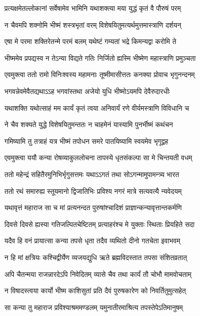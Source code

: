 \twolineshloka
{प्रत्यक्षमेतल्लोकानां सर्वेषामेव भामिनि}
{यथाशक्त्या मया युद्धं कृतं वै पौरुषं परम्}


\twolineshloka
{न चैवमपि शक्नोमि भीष्मं शस्त्रभृतां वरम्}
{विशेषयितुमत्यर्थमुत्तमास्त्राणि दर्शयन्}


\twolineshloka
{एषा मे परमा शक्तिरेतन्मे परमं बलम्}
{यथेष्टं गम्यतां भद्रे किमन्यद्वा करोमि ते}


\twolineshloka
{भीष्ममेव प्रपद्यस्व न तेऽन्या विद्यते गतिः}
{निर्जितो ह्यस्मि भीष्मेण महास्त्राणि प्रमुञ्चता}


\twolineshloka
{एवमुक्त्वा ततो रामो विनिःश्वस्य महामनाः}
{तूष्मीमासीत्ततः कनक्या प्रोवाच भृगुनन्दनम्}


\twolineshloka
{भगवन्नेवमेवैतद्यथाऽऽह भगवांस्तथा}
{अजेयो युधि भीष्मोऽयमपि देवैरुदारधीः}


\twolineshloka
{यथाशक्ति यथोत्साहं मम कार्यं कृतं त्वया}
{अनिवार्यं रणे वीर्यमस्त्राणि विविधानि च}


\twolineshloka
{ने चैव शक्यते युद्धे विशेषयितुमन्ततः}
{न चाहमेनं यास्यामि पुनर्भीष्मं कथंचन}


\twolineshloka
{गमिष्यामि तु तत्राहं यत्र भीष्मं तपोधन}
{समरे पातयिष्यामि स्वयमेव भृगूद्वह}


\twolineshloka
{एवमुक्त्वा ययौ कन्या रोषव्याकुललोचना}
{तापस्ये धृतसंकल्पा सा मे चिन्तयती वधम्}


\twolineshloka
{ततो महेन्द्रं सहितैरमुनिभिर्भृगुसत्तमः}
{यथाऽऽगतं तथा सोऽगन्मामुपामन्त्र्य भारत}


\twolineshloka
{ततो रथं समारुह्य स्तूयमानो द्विजातिभिः}
{प्रविश्य नगरं मात्रे सत्यवत्यै न्यवेदयम्}


\twolineshloka
{यथावृत्तं महाराज सा च मां प्रत्यनन्दत}
{पुरुषांश्चादिशं प्राज्ञान्कन्यावृत्तान्तकर्मणि}


\twolineshloka
{दिवसे दिवसे ह्यस्या गतिजल्पितचेष्टितम्}
{प्रत्याहरंश्च मे युक्ताः स्थिताः प्रियहिते सदा}


\twolineshloka
{यदैव हि वनं प्रायात्सा कन्या तपसे धृता}
{तदैव व्यथितो दीनो गतचेता इवाभवम्}


\twolineshloka
{न हि मां क्षत्रियः कश्चिद्वीर्येण व्यजयद्युधि}
{ऋते ब्रह्मविदस्तात तपसा संशितव्रतात्}


\twolineshloka
{अपि चैतन्मया राजन्नारदेऽपि निवेदितम्}
{व्यासे चैव तथा कार्यं तौ चोभौ मामवोचताम्}


\twolineshloka
{न विषादस्त्वया कार्यो भीष्म काशिसुतां प्रति}
{दैवं पुरुषकारेण को निवर्तितुमुत्सहेत्}


\twolineshloka
{सा कन्या तु महाराज प्रविश्याश्रममण्डलम्}
{यमुनातीरमाश्रित्य तपस्तेपेऽतिमानुषम्}


